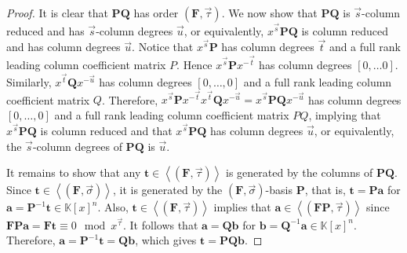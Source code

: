 \begin{proof}
It is clear that $\mathbf{P}\mathbf{Q}$ has order $(\mathbf{F},\vec{\tau})$.
We now show that $\mathbf{P}\mathbf{Q}$ is $\vec{s}$-column reduced
and has $\vec{s}$-column degrees $\vec{u}$, or equivalently, $x^{\vec{s}}\mathbf{P}\mathbf{Q}$
is column reduced and has column degrees $\vec{u}$. Notice that $x^{\vec{s}}\mathbf{P}$
has column degrees $\vec{t}$ and a full rank leading column coefficient
matrix $P$. Hence $x^{\vec{s}}\mathbf{P}x^{-\vec{t}}$ has column
degrees $\left[0,\dots0\right]$. Similarly, $x^{\vec{t}}\mathbf{Q}x^{-\vec{u}}$
has column degrees $[0,\dots,0]$ and a full rank leading column coefficient
matrix $Q$. Therefore, $x^{\vec{s}}\mathbf{P}x^{-\vec{t}}x^{\vec{t}}\mathbf{Q}x^{-\vec{u}}=x^{\vec{s}}\mathbf{P}\mathbf{Q}x^{-\vec{u}}$
has column degrees $[0,\dots,0]$ and a full rank leading column coefficient
matrix $PQ$, implying that $x^{\vec{s}}\mathbf{P}\mathbf{Q}$ is
column reduced and that $x^{\vec{s}}\mathbf{P}\mathbf{Q}$ has column
degrees $\vec{u}$, or equivalently, the $\vec{s}$-column degrees
of $\mathbf{PQ}$ is $\vec{u}$.

It remains to show that any $\mathbf{t}\in\left\langle \left(\mathbf{F},\vec{\tau}\right)\right\rangle $
is generated by the columns of $\mathbf{PQ}$. Since $\mathbf{t}\in\left\langle \left(\mathbf{F},\vec{\sigma}\right)\right\rangle $,
it is generated by the $\left(\mathbf{F},\vec{\sigma}\right)$-basis
$\mathbf{P}$, that is, $\mathbf{t}=\mathbf{P}\mathbf{a}$ for $\mathbf{a}=\mathbf{P}^{-1}\mathbf{t}\in\mathbb{K}\left[x\right]^{n}$.
Also, $\mathbf{t}\in\left\langle \left(\mathbf{F},\vec{\tau}\right)\right\rangle $
implies that $\mathbf{a}\in\left\langle \left(\mathbf{FP},\vec{\tau}\right)\right\rangle $
since $\mathbf{F}\mathbf{P}\mathbf{a}=\mathbf{F}\mathbf{t}\equiv0\mod x^{\vec{\tau}}$.
It follows that $\mathbf{a}=\mathbf{Q}\mathbf{b}$ for $\mathbf{b}=\mathbf{Q}^{-1}\mathbf{a}\in\mathbb{K}\left[x\right]^{n}$.
Therefore, $\mathbf{a}=\mathbf{P}^{-1}\mathbf{t}=\mathbf{Q}\mathbf{b}$,
which gives $\mathbf{t}=\mathbf{P}\mathbf{Q}\mathbf{b}$.\end{proof}
